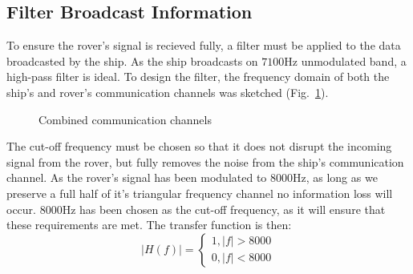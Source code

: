 \documentclass[12pt]{article}
\numberwithin{equation}{section}
\numberwithin{figure}{section}
\numberwithin{table}{section}
\begin{document}
\pagebreak
\subsection{Filter Broadcast Information}
To ensure the rover's signal is recieved fully, a filter must be applied to the
data broadcasted by the ship. As the ship broadcasts on $7100$Hz unmodulated
band, a high-pass filter is ideal. To design the filter, the frequency domain
of both the ship's and rover's communication channels was sketched
(Fig.~\ref{fig:p1-channels}).

\begin{figure}[ht]
    \centering
    \caption{Combined communication channels\label{fig:p1-channels}}
\end{figure}

The cut-off frequency must be chosen so that it does not disrupt the incoming
signal from the rover, but fully removes the noise from the ship's
communication channel. As the rover's signal has been modulated to $8000$Hz, as
long as we preserve a full half of it's triangular frequency channel no
information loss will occur. $8000$Hz has been chosen as the cut-off frequency,
as it will ensure that these requirements are met. The transfer function is
then:
\begin{equation*}
    |H(f)| = \begin{cases}
        1, |f| > 8000 \\
        0, |f| < 8000
    \end{cases}
\end{equation*}
\end{document}
